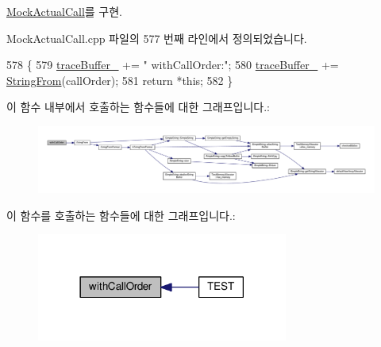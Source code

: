 \hyperlink{class_mock_actual_call_a8ab4e2208020ae51eb1c792082c0eda9}{Mock\+Actual\+Call}를 구현.



Mock\+Actual\+Call.\+cpp 파일의 577 번째 라인에서 정의되었습니다.


\begin{DoxyCode}
578 \{
579     \hyperlink{class_mock_actual_call_trace_ab139777fb0949c9d0fbdb4d8b2e63351}{traceBuffer\_} += \textcolor{stringliteral}{" withCallOrder:"};
580     \hyperlink{class_mock_actual_call_trace_ab139777fb0949c9d0fbdb4d8b2e63351}{traceBuffer\_} += \hyperlink{_simple_string_8h_a195ee4ca8d909f9ebf37e963d4564446}{StringFrom}(callOrder);
581     \textcolor{keywordflow}{return} *\textcolor{keyword}{this};
582 \}
\end{DoxyCode}


이 함수 내부에서 호출하는 함수들에 대한 그래프입니다.\+:
\nopagebreak
\begin{figure}[H]
\begin{center}
\leavevmode
\includegraphics[width=350pt]{class_mock_actual_call_trace_aa025e9eb6893865e7f1df772334bf3fc_cgraph}
\end{center}
\end{figure}




이 함수를 호출하는 함수들에 대한 그래프입니다.\+:
\nopagebreak
\begin{figure}[H]
\begin{center}
\leavevmode
\includegraphics[width=234pt]{class_mock_actual_call_trace_aa025e9eb6893865e7f1df772334bf3fc_icgraph}
\end{center}
\end{figure}


